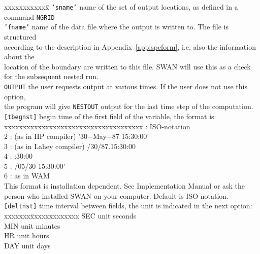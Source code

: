 \documentclass[12pt]{book}
\begin{document}
\begin{tabbing}
 xxxxxxxxxxxx\= \kill
{\tt {'sname'}} \> name of the set of output locations, as defined in a command {\tt NGRID}\\
{\tt {'fname'}} \> name of the data file where the output is written to. The file is structured\+\\
                   according to the description in Appendix~\ref{app:spcform}, i.e. also the information about the\\
                   location of the boundary are written to this file. SWAN will use this as a check\\
                   for the subsequent nested run.\-\\
{\tt OUTPUT}    \> the user requests output at various times. If the user does not use this option,\+\\
                   the program will give {\tt NESTOUT} output for the last time step of the computation.\-\\
{\tt [tbegnst]} \> begin time of the first field of the variable, the format is:\+\\
                   \pushtabs
                   xx\=xxxxxxxxxxxxxxxxxxxxxx\=xxxxxxxxxxxxx  \>: ISO-notation                     \\
                   2 \>: (as in HP compiler)    \> '30$-$May$-$87 15:30:00' \\
                   3 \>: (as in Lahey compiler) /30/87.15:30:00        \\
                   4 \>:                        :30:00                 \\
                   5 \>:                        /05/30 15:30:00'       \\
                   6 \>: as in WAM                             \\
                   \poptabs
                   This format is installation dependent. See Implementation Manual or ask the\\
                   person who installed SWAN on your computer. Default is ISO-notation.\-\\
{\tt [deltnst]} \> time interval between fields, the unit is indicated in the next option:\+\\
                   \pushtabs
                   xxxxxxx\=xxxxxxxxxxxxx \kill
                   SEC \> unit seconds\\
                   MIN \> unit minutes\\
                   HR  \> unit hours\\
                   DAY \> unit days\-\\
                   \poptabs
\end{tabbing}
\end{document}
